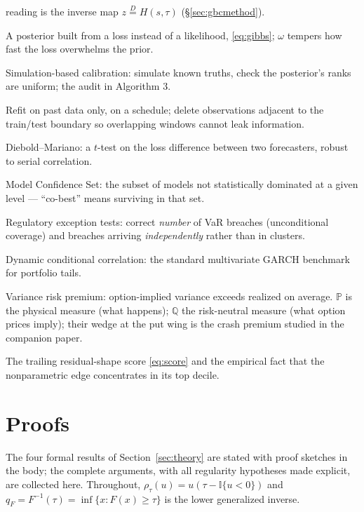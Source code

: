 \documentclass[11pt]{article}
\newcommand{\Q}{\mathbb{Q}}
\newcommand{\PP}{\mathbb{P}}
\theoremstyle{remark}
\begin{document}
\begin{description}[leftmargin=1.6em,itemsep=1pt,font=\normalfont\bfseries]
reading is the inverse map $z \overset{D}{=} H(s,\tau)$
(\S\ref{sec:gbcmethod}).
\item[Gibbs / generalized-Bayes posterior] A posterior built from a
loss instead of a likelihood, \eqref{eq:gibbs}; $\omega$ tempers how
fast the loss overwhelms the prior.
\item[SBC] Simulation-based calibration: simulate known truths, check
the posterior's ranks are uniform; the audit in Algorithm 3.
\item[Walk-forward, purge, embargo] Refit on past data only, on a
schedule; delete observations adjacent to the train/test boundary so
overlapping windows cannot leak information.
\item[DM test] Diebold--Mariano: a $t$-test on the loss difference
between two forecasters, robust to serial correlation.
\item[MCS] Model Confidence Set: the subset of models not
statistically dominated at a given level --- ``co-best'' means surviving
in that set.
\item[Kupiec / Christoffersen] Regulatory exception tests: correct
\emph{number} of VaR breaches (unconditional coverage) and breaches
arriving \emph{independently} rather than in clusters.
\item[DCC] Dynamic conditional correlation: the standard multivariate
GARCH benchmark for portfolio tails.
\item[VRP; $\PP$ vs.\ $\Q$] Variance risk premium: option-implied
variance exceeds realized on average. $\PP$ is the physical measure
(what happens); $\Q$ the risk-neutral measure (what option prices
imply); their wedge at the put wing is the crash premium studied in the
companion paper.
\item[Misspecification frontier] The trailing residual-shape score
\eqref{eq:score} and the empirical fact that the nonparametric edge
concentrates in its top decile.
\end{description}

\section{Proofs}\label{app:proofs}

The four formal results of Section~\ref{sec:theory} are stated with
proof sketches in the body; the complete arguments, with all regularity
hypotheses made explicit, are collected here. Throughout, $\rho_\tau(u)
= u(\tau - \mathbb{I}\{u<0\})$ and $q_F = F^{-1}(\tau) = \inf\{x:F(x)\ge
\tau\}$ is the lower generalized inverse.
\end{document}

